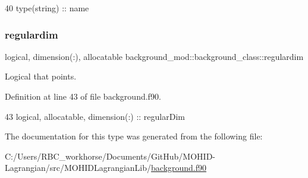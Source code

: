 \begin{DoxyCode}
40         \textcolor{keywordtype}{type}(string) :: name
\end{DoxyCode}
\mbox{\label{structbackground__mod_1_1background__class_a78b62368ed110d33fd809e8ff101839b}} 
\subsubsection{\texorpdfstring{regulardim}{regulardim}}
{\footnotesize\ttfamily logical, dimension(\+:), allocatable background\+\_\+mod\+::background\+\_\+class\+::regulardim\hspace{0.3cm}{\ttfamily [private]}}



Logical that points. 



Definition at line 43 of file background.\+f90.


\begin{DoxyCode}
43         \textcolor{keywordtype}{logical}, \textcolor{keywordtype}{allocatable}, \textcolor{keywordtype}{dimension(:)} :: regularDim
\end{DoxyCode}


The documentation for this type was generated from the following file\+:\begin{DoxyCompactItemize}
\item 
C\+:/\+Users/\+R\+B\+C\+\_\+workhorse/\+Documents/\+Git\+Hub/\+M\+O\+H\+I\+D-\/\+Lagrangian/src/\+M\+O\+H\+I\+D\+Lagrangian\+Lib/\mbox{\hyperlink{background_8f90}{background.\+f90}}\end{DoxyCompactItemize}
